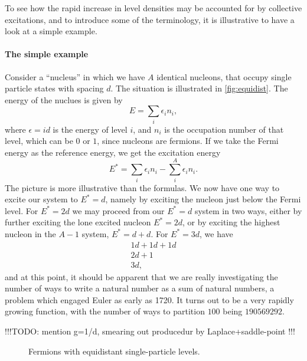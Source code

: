To see how the rapid increase in level densities may be accounted for by collective excitations, and to introduce some of the terminology, it is illustrative to have a look at a simple example.

\paragraph{The simple example}
Consider a ``nucleus'' in which we have $A$ identical nucleons, that occupy single particle states with spacing $d$. The situation is illustrated in \autoref{fig:equidist}. The energy of the nuclues is given by 
\begin{equation}
E=\sum_i \epsilon_i n_i,
\end{equation}
where $\epsilon = id$ is the energy of level $i$, and $n_i$ is the occupation number of that level, which can be $0$ or $1$, since nucleons are fermions.
If we take the Fermi energy as the reference energy, we get the excitation energy
\begin{equation}
E^*=\sum_i \epsilon_i n_i - \sum_i^A \epsilon_i n_i.
\end{equation}
The picture is more illustrative than the formulas. We now have one way to excite our system to $E^*=d$, namely by exciting the nucleon just below the Fermi level. For $E^*=2d$ we may proceed from our $E^*=d$ system in two ways, either by further exciting the lone excited nucleon $E^* = 2d$, or by exciting the highest nucleon in the $A-1$ system, $E^*=d+d$. For $E^*=3d$, we have
\begin{equation}
\begin{aligned}
1d+1d+1d \\
2d+1 \\
3d,
\end{aligned}
\end{equation}
and at this point, it should be apparent that we are really investigating the number of ways to write a natural number as a sum of natural numbers, a problem which engaged Euler as early as 1720\cite{mathworld}. It turns out to be a very rapidly growing function, with the number of ways to partition $100$ being $190 569 292$\cite{mathworld}.

!!!TODO: mention g=1/d,  smearing out producedur by Laplace+saddle-point !!!

\begin{figure}

\caption{\label{fig:equidist} Fermions with equidistant single-particle levels.}
\end{figure}

